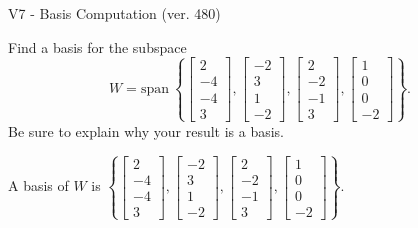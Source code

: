 \begin{exercise}
  \begin{exerciseTitle}V7 - Basis Computation (ver. 480)\end{exerciseTitle}
  \begin{exerciseStatement}
    Find a basis for the subspace 
\[W=\mathrm{span}\ \left\{\left[\begin{array}{r}
2 \\
-4 \\
-4 \\
3
\end{array}\right] , \left[\begin{array}{r}
-2 \\
3 \\
1 \\
-2
\end{array}\right] , \left[\begin{array}{r}
2 \\
-2 \\
-1 \\
3
\end{array}\right] , \left[\begin{array}{r}
1 \\
0 \\
0 \\
-2
\end{array}\right]\right\}.\]
 Be sure to explain why your result is a basis.


  \end{exerciseStatement}
  \begin{exerciseAnswer}
   A basis of \(W\) is  \(\left\{\left[\begin{array}{r}
2 \\
-4 \\
-4 \\
3
\end{array}\right] , \left[\begin{array}{r}
-2 \\
3 \\
1 \\
-2
\end{array}\right] , \left[\begin{array}{r}
2 \\
-2 \\
-1 \\
3
\end{array}\right] , \left[\begin{array}{r}
1 \\
0 \\
0 \\
-2
\end{array}\right]\right\}\).
  


  \end{exerciseAnswer}
\end{exercise}